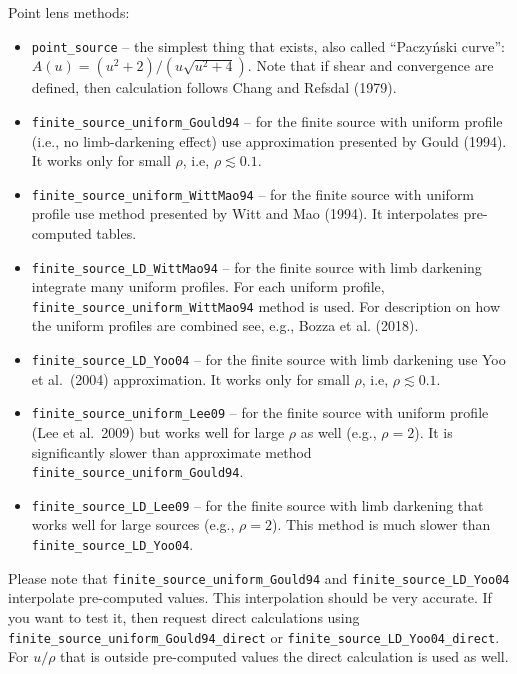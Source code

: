 \documentclass[12pt]{article}
\begin{document}
\bigskip\bigskip
Point lens methods:
\begin{itemize}
\item {\tt point\_source} -- the simplest thing that exists, also called ``Paczy\'nski curve'':\linebreak $A(u) = \left(u^2+2\right)/\left(u\sqrt{u^2+4}\right)$. Note that if shear and convergence are defined, then calculation follows Chang and Refsdal (1979).
\item {\tt finite\_source\_uniform\_Gould94} -- for the finite source with uniform profile (i.e., no limb-darkening effect) use approximation presented by Gould (1994).  It works only for small $\rho$, i.e, $\rho\lesssim0.1$.
\item {\tt finite\_source\_uniform\_WittMao94} -- for the finite source with uniform profile use method presented by Witt and Mao (1994).  It interpolates pre-computed tables.
\item {\tt finite\_source\_LD\_WittMao94} -- for the finite source with limb darkening integrate many uniform profiles. For each uniform profile, {\tt finite\_source\_uniform\_WittMao94} method is used. For description on how the uniform profiles are combined see, e.g., Bozza et al. (2018).
\item {\tt finite\_source\_LD\_Yoo04} -- for the finite source with limb darkening use Yoo et al.~(2004) approximation.  It works only for small $\rho$, i.e, $\rho\lesssim0.1$.
\item {\tt finite\_source\_uniform\_Lee09} -- for the finite source with uniform profile (Lee et al.~2009) but works well for large $\rho$ as well (e.g., $\rho = 2$).  It is significantly slower than approximate method {\tt finite\_source\_uniform\_Gould94}.
\item {\tt finite\_source\_LD\_Lee09} -- for the finite source with limb darkening that works well for large sources (e.g., $\rho = 2$).  This method is much slower than {\tt finite\_source\_LD\_Yoo04}.
\end{itemize}
Please note that {\tt finite\_source\_uniform\_Gould94} and {\tt finite\_source\_LD\_Yoo04} interpolate pre-com\-pu\-ted values.  This interpolation should be very accurate.
If you want to test it, then request direct calculations using {\tt finite\_source\_uniform\_Gould94\_direct} or {\tt finite\_source\_LD\_Yoo04\_direct}.
For $u/\rho$ that is outside pre-computed values the direct calculation is used as well.
\end{document}
